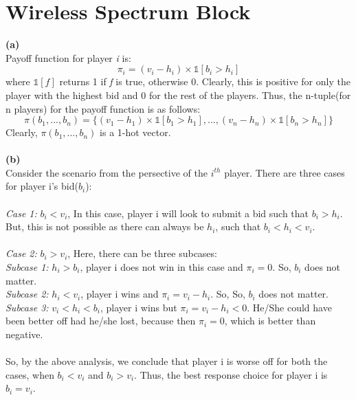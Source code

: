 \documentclass{article}
\begin{document}
\section{Wireless Spectrum Block}
\textbf{(a)} \\
Payoff function for player \emph{i} is:
$$ \pi_i = (v_i-h_i) \times \mathds{1}[b_i>h_i] $$
where $\mathds{1}[f]$ returns 1 if \emph{f} is true, otherwise 0. Clearly, this is positive for only the player with the highest bid and 0 for the rest of the players. Thus, the n-tuple(for n players) for the payoff  function is as follows:
$$\pi(b_1,...,b_n) = \{(v_1-h_1) \times \mathds{1}[b_1>h_1], ... ,(v_n-h_n) \times \mathds{1}[b_n>h_n]\}$$
Clearly, $\pi(b_1,...,b_n)$ is a 1-hot vector.\\ \\
\textbf{(b)} \\
Consider the scenario from the persective of the $i^{th}$ player. There are three cases for player i's bid($b_i$): \\ \\
\emph{Case 1:} $b_i < v_i$, In this case, player i will look to submit a bid such that $b_i > h_i$. But, this is not possible as there can always be $h_i$, such that $ b_i < h_i < v_i$. \\ \\
\emph{Case 2:} $b_i > v_i$, Here, there can be three subcases: \\
\emph{Subcase 1:} $h_i > b_i$, player i does not win in this case and $\pi_i = 0$. So, $b_i$ does not matter.\\
\emph{Subcase 2:} $h_i < v_i$, player i wins and $\pi_i = v_i-h_i$. So, So, $b_i$ does not matter.\\
\emph{Subcase 3:} $v_i < h_i < b_i$, player i wins but $\pi_i = v_i-h_i < 0$. He/She could have been better off had he/she lost, because then $\pi_i = 0$, which is better than negative. \\ \\
So, by the above analysis, we conclude that player i is worse off for both the cases, when $b_i< v_i$ and $b_i > v_i$. Thus, the best response choice for player i is $b_i = v_i$.
\end{document}
